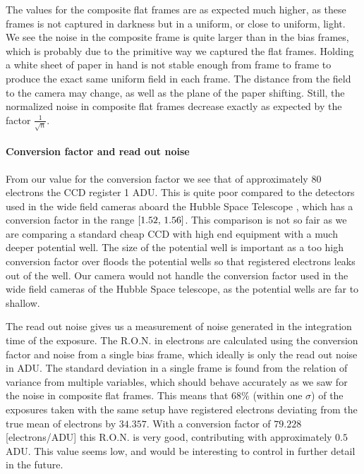 \documentclass{emulateapj}
\begin{document}
The values for the composite flat frames are as expected much higher, as these frames is not captured in darkness but in a uniform, or close to uniform, light. We see the noise in the composite frame is quite larger than in the bias frames, which is probably due to the primitive way we captured the flat frames. Holding a white sheet of paper in hand is not stable enough from frame to frame to produce the exact same uniform field in each frame.  The distance from the field to the camera may change, as well as the plane of the paper shifting. Still, the normalized noise in composite flat frames decrease exactly as expected by the factor $\frac{1}{\sqrt{n}}$.
\paragraph{Conversion factor and read out noise}
From our value for the conversion factor we see that of approximately $80$ electrons the CCD register 1 ADU. This is quite poor compared to the detectors used in the wide field cameras aboard the Hubble Space Telescope \citep{HSTdetectors}, which has a conversion factor in the range $\qty[1.52,\, 1.56]$. This comparison is not so fair as we are comparing a standard cheap CCD with high end equipment with a much deeper potential well. The size of the potential well is important as a too high conversion factor over floods the potential wells so that registered electrons leaks out of the well. Our camera would not handle the conversion factor used in the wide field cameras of the Hubble Space telescope, as the potential wells are far to shallow.

The read out noise gives us a measurement of noise generated in the integration time of the exposure. The R.O.N. in electrons are calculated using the conversion factor and noise from a single bias frame, which ideally is only the read out noise in ADU. The standard deviation in a single frame is found from the relation of variance from multiple variables, which should behave accurately as we saw for the noise in composite flat frames.  This means that $68\%$ (within one $\sigma$) of the exposures taken with the same setup have registered electrons deviating from the true mean of electrons by $34.357$. With a conversion factor of $79.228$ [electrons/ADU] this R.O.N. is very good, contributing with approximately $0.5$ ADU. This value seems low, and would be interesting to control in further detail in the future.
\end{document}
